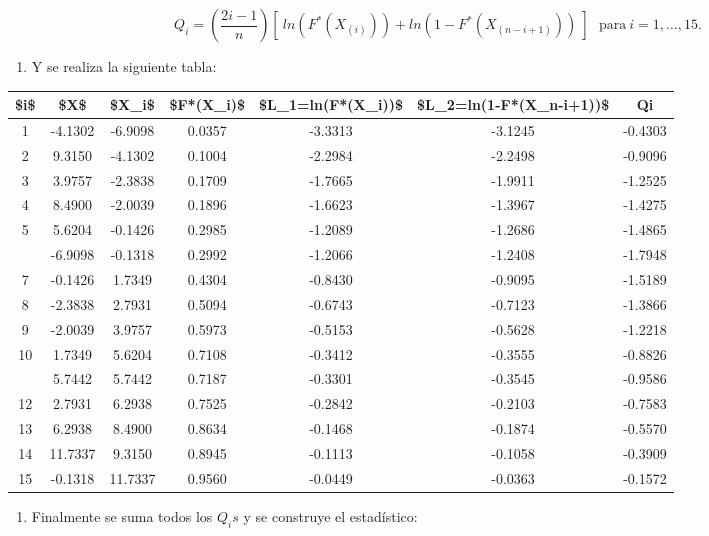 \documentclass[
  a4paper,
  oneside,
  openany]{book}
\providecommand{\tightlist}{%
  \setlength{\itemsep}{0pt}\setlength{\parskip}{0pt}}
\begin{document}
\[Q_{i}=\left(\frac{2i-1}{n}\right)[ \ ln(F^*(X_{(i)})) +ln(1-F^*(X_{(n-i+1)})) \ ] \ \ \ \mbox{para} \  i=1,\ldots,15.\]

\begin{enumerate}
\def\labelenumi{\arabic{enumi})}
\setcounter{enumi}{5}
\tightlist
\item
  Y se realiza la siguiente tabla:
\end{enumerate}

\begin{table}
\centering
\begin{tabular}{ccccccc}
\toprule
\$i\$ & \$X\$ & \$X\_i\$ & \$F*(X\_i)\$ & \$L\_1=ln(F*(X\_i))\$ & \$L\_2=ln(1-F*(X\_n-i+1))\$ & Qi\\
\midrule
1 & -4.1302 & -6.9098 & 0.0357 & -3.3313 & -3.1245 & -0.4303\\
2 & 9.3150 & -4.1302 & 0.1004 & -2.2984 & -2.2498 & -0.9096\\
3 & 3.9757 & -2.3838 & 0.1709 & -1.7665 & -1.9911 & -1.2525\\
4 & 8.4900 & -2.0039 & 0.1896 & -1.6623 & -1.3967 & -1.4275\\
5 & 5.6204 & -0.1426 & 0.2985 & -1.2089 & -1.2686 & -1.4865\\
\addlinespace
6 & -6.9098 & -0.1318 & 0.2992 & -1.2066 & -1.2408 & -1.7948\\
7 & -0.1426 & 1.7349 & 0.4304 & -0.8430 & -0.9095 & -1.5189\\
8 & -2.3838 & 2.7931 & 0.5094 & -0.6743 & -0.7123 & -1.3866\\
9 & -2.0039 & 3.9757 & 0.5973 & -0.5153 & -0.5628 & -1.2218\\
10 & 1.7349 & 5.6204 & 0.7108 & -0.3412 & -0.3555 & -0.8826\\
\addlinespace
11 & 5.7442 & 5.7442 & 0.7187 & -0.3301 & -0.3545 & -0.9586\\
12 & 2.7931 & 6.2938 & 0.7525 & -0.2842 & -0.2103 & -0.7583\\
13 & 6.2938 & 8.4900 & 0.8634 & -0.1468 & -0.1874 & -0.5570\\
14 & 11.7337 & 9.3150 & 0.8945 & -0.1113 & -0.1058 & -0.3909\\
15 & -0.1318 & 11.7337 & 0.9560 & -0.0449 & -0.0363 & -0.1572\\
\bottomrule
\end{tabular}
\end{table}

\begin{enumerate}
\def\labelenumi{\arabic{enumi})}
\setcounter{enumi}{6}
\tightlist
\item
  Finalmente se suma todos los \(Q_{i}s\) y se construye el estadístico:
\end{enumerate}
\end{document}
